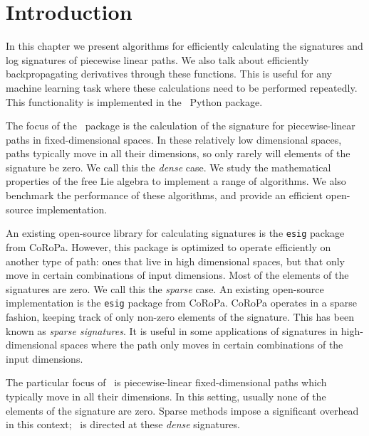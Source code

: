 
\section{Introduction}
\label{sec:iisigintro}

In this chapter we present algorithms for efficiently calculating the signatures and log signatures of piecewise linear paths. We also talk about efficiently backpropagating derivatives through these functions. This is useful for any machine learning task where these calculations need to be performed repeatedly. This functionality is implemented in the \ii\ Python package.

The focus of the \ii\ package is the calculation of the signature for piecewise-linear paths in fixed-dimensional spaces.
In these relatively low dimensional spaces, paths typically move in all their dimensions, so only rarely will elements of the signature be zero.
We call this the \emph{dense} case.
We study the mathematical properties of the free Lie algebra to implement a range of algorithms.
We also benchmark the performance of these algorithms, and provide an efficient open-source implementation.

An existing open-source library for calculating signatures is the \verb|esig| package from CoRoPa\cite{coropa}.
However, this package is optimized to operate efficiently on another type of path: ones that live in high dimensional spaces, but that only move in certain combinations of input dimensions.
Most of the elements of the signatures are zero.
We call this the \emph{sparse} case.
\iffalse
An existing open-source implementation is the \verb|esig| package from CoRoPa\cite{coropa}.
CoRoPa operates in a sparse fashion, keeping track of only non-zero elements of the signature. 
This has been known as %
\emph{sparse signatures}.
It is useful in some applications of signatures in high-dimensional spaces where the path only moves in certain combinations of the input dimensions.

The particular focus of \ii\ is piecewise-linear fixed-dimensional paths which typically move in all their dimensions. %
In this setting, usually none of the elements of the signature are zero. Sparse methods impose a significant overhead in this context; \ii\ is directed at these \emph{dense} signatures. 


